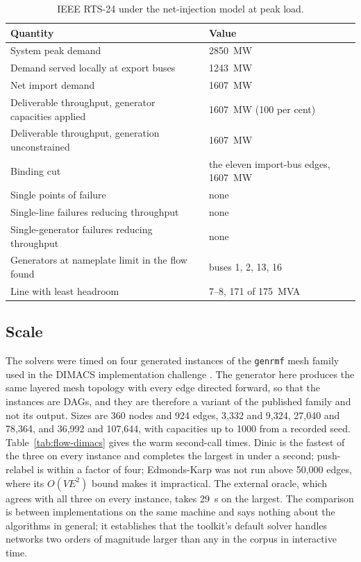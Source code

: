 \documentclass[12pt]{report}
\begin{document}
\begin{table}[htbp]
\centering
\caption{IEEE RTS-24 under the net-injection model at peak load.}
\label{tab:flow-rts24}
\small
\renewcommand{\arraystretch}{1.15}
\begin{tabular}{ll}
\toprule
Quantity & Value \\
\midrule
System peak demand & 2850~MW \\
Demand served locally at export buses & 1243~MW \\
Net import demand & 1607~MW \\
Deliverable throughput, generator capacities applied & 1607~MW (100 per cent) \\
Deliverable throughput, generation unconstrained & 1607~MW \\
Binding cut & the eleven import-bus edges, 1607~MW \\
Single points of failure & none \\
Single-line failures reducing throughput & none \\
Single-generator failures reducing throughput & none \\
Generators at nameplate limit in the flow found & buses 1, 2, 13, 16 \\
Line with least headroom & 7--8, 171 of 175~MVA \\
\bottomrule
\end{tabular}
\end{table}

\subsection{Scale}
\label{sec:flow-scale}

The solvers were timed on four generated instances of the \texttt{genrmf} mesh family used in
the DIMACS implementation challenge \cite{johnson1993dimacs}. The generator here produces the
same layered mesh topology with every edge directed forward, so that the instances are DAGs,
and they are therefore a variant of the published family and not its output. Sizes are 360
nodes and 924 edges, 3,332 and 9,324, 27,040 and 78,364, and 36,992 and 107,644, with
capacities up to 1000 from a recorded seed. Table~\ref{tab:flow-dimacs} gives the warm
second-call times. Dinic is the fastest of the three on every instance and completes the
largest in under a second; push-relabel is within a factor of four; Edmonds-Karp was not run
above 50,000 edges, where its $O(VE^2)$ bound makes it impractical. The external oracle,
which agrees with all three on every instance, takes 29~s on the largest. The comparison is
between implementations on the same machine and says nothing about the algorithms in
general; it establishes that the toolkit's default solver handles networks two orders of
magnitude larger than any in the corpus in interactive time.
\end{document}
